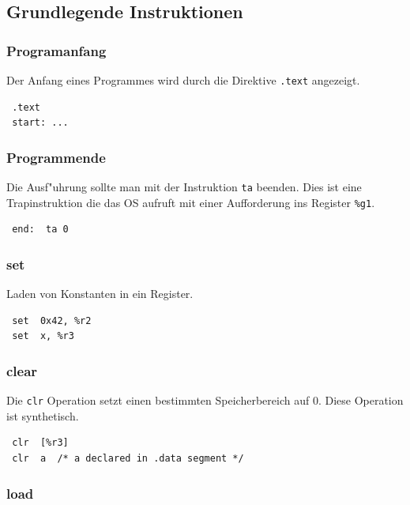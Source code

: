 \documentclass[german, 10pt, a4paper, twocolumn]{scrartcl}
\begin{document}
\subsection{Grundlegende Instruktionen}

\subsubsection{Programanfang}

Der Anfang eines Programmes wird durch die Direktive \verb#.text# angezeigt.

\begin{verbatim}
 .text
 start: ...
\end{verbatim}

\subsubsection{Programmende}

Die Ausf"uhrung sollte man mit der Instruktion \verb#ta# beenden. Dies ist eine Trapinstruktion die das OS aufruft mit einer Aufforderung ins Register \verb#%g1#.

\begin{verbatim}
 end:  ta 0
\end{verbatim}

\subsubsection{set}

Laden von Konstanten in ein Register.

\begin{verbatim}
 set  0x42, %r2
 set  x, %r3
\end{verbatim}

\subsubsection{clear}

Die \verb#clr# Operation setzt einen bestimmten Speicherbereich auf 0. Diese Operation ist synthetisch.

\begin{verbatim}
 clr  [%r3]
 clr  a  /* a declared in .data segment */
\end{verbatim}

\subsubsection{load}
\end{document}
